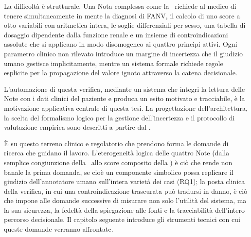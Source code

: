 La difficoltà è strutturale.
Una Nota complessa come la \notenova\ richiede al medico di tenere simultaneamente
in mente la diagnosi di FANV, il calcolo di uno score a otto variabili con
aritmetica intera, le soglie differenziali per sesso, una tabella di dosaggio
dipendente dalla funzione renale e un insieme di controindicazioni assolute che
si applicano in modo disomogeneo ai quattro principi attivi.
Ogni parametro clinico non rilevato introduce un margine di incertezza che il
giudizio umano gestisce implicitamente, mentre un sistema formale richiede regole
esplicite per la propagazione del valore ignoto attraverso la catena decisionale.

L'automazione di questa verifica, mediante un sistema che integri la lettura delle
Note con i dati clinici del paziente e produca un esito motivato e tracciabile,
è la motivazione applicativa centrale di questa tesi.
La progettazione dell'architettura, la scelta del formalismo logico per la gestione
dell'incertezza e il protocollo di valutazione empirica sono descritti a partire
dal .

È su questo terreno clinico e regolatorio che prendono forma le domande di ricerca
che guidano il lavoro. L'eterogeneità logica delle quattro Note (dalla semplice
congiunzione della \notezero\ allo score composito della \notenova) è ciò che rende
non banale la prima domanda, se cioè un componente simbolico possa replicare il
giudizio dell'annotatore umano sull'intera varietà dei casi (RQ1); la posta clinica
della verifica, in cui una controindicazione trascurata può tradursi in danno, è ciò
che impone alle domande successive di misurare non solo l'utilità del sistema, ma la
sua sicurezza, la fedeltà della spiegazione alle fonti e la tracciabilità dell'intero
percorso decisionale. Il capitolo seguente introduce gli strumenti tecnici con cui
queste domande verranno affrontate.
